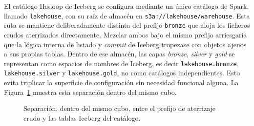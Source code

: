 El catálogo Hadoop de Iceberg se configura mediante un único catálogo de
Spark, llamado \texttt{lakehouse}, con su raíz de almacén en
\texttt{s3a://lakehouse/warehouse}. Esta ruta se mantiene deliberadamente
distinta del prefijo \texttt{bronze} que aloja los ficheros crudos
aterrizados directamente. Mezclar ambos bajo el mismo prefijo arriesgaría
que la lógica interna de listado y \textit{commit} de Iceberg tropezase
con objetos ajenos a sus propias tablas. Dentro de ese almacén, las capas
\textit{bronze}, \textit{silver} y \textit{gold} se representan como
espacios de nombres de Iceberg, es decir \texttt{lakehouse.bronze},
\texttt{lakehouse.silver} y \texttt{lakehouse.gold}, no como catálogos
independientes. Esto evita triplicar la superficie de configuración sin
necesidad funcional alguna. La Figura~\ref{fig:tfm_bucket_layout} muestra
esta separación dentro del mismo cubo.

\begin{figure}[H]
  \centering
  \caption{Separación, dentro del mismo cubo, entre el prefijo de
  aterrizaje crudo y las tablas Iceberg del catálogo.}
  \label{fig:tfm_bucket_layout}
\end{figure}

